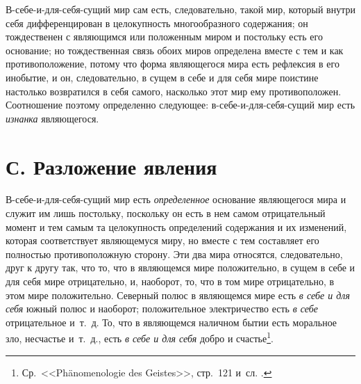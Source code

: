 В-себе-и-для-себя-сущий мир сам есть, следовательно, такой мир, который
внутри себя дифференцирован в целокупность многообразного содержания; он
тождественен с являющимся или положенным миром и постольку есть его
основание; но тождественная связь обоих миров определена вместе с тем и как
противоположение, потому что форма являющегося мира есть рефлексия в его
инобытие, и он, следовательно, в сущем в себе и для себя мире поистине
настолько возвратился в себя самого, насколько этот мир ему противоположен.
Соотношение поэтому определенно следующее: в-себе-и-для-себя-сущий мир есть
{\em изнанка} являющегося.


\section[С. Разложение явления]{С. Разложение явления}

В-себе-и-для-себя-сущий мир есть
{\em определенное} основание являющегося мира и служит
им лишь постольку, поскольку он есть в нем самом отрицательный момент и тем
самым та целокупность определений содержания и их изменений, которая
соответствует являющемуся миру, но вместе с тем составляет его полностью
противоположную сторону. Эти два мира относятся, следовательно, друг к
другу так, что то, что в являющемся мире положительно, в сущем в себе и для
себя мире отрицательно, и, наоборот, то, что в том мире отрицательно, в
этом мире положительно. Северный полюс в являющемся мире есть
{\em в себе и для себя} южный полюс и наоборот;
положительное электричество есть {\em в себе}
отрицательное и~т.~д. То, что в являющемся наличном бытии есть моральное
зло, несчастье и~т.~д., есть {\em в себе и для себя}
добро и счастье\footnote{Ср.~<<Phänomenologie des Geistes>>, стр.~121 и~сл.
.}.

